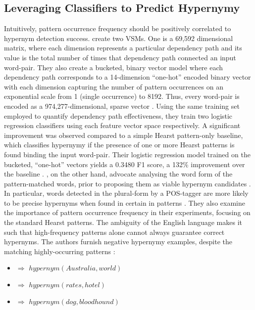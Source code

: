 \subsection{Leveraging Classifiers to Predict Hypernymy}
Intuitively, pattern occurrence frequency should be positively correlated to hypernym detection success.  \citeauthor{Snow2004} create two \ac{VSM}s.  One is a 69,592 dimensional matrix, where each dimension represents a particular dependency path and its value is the total number of times that dependency path connected an input word-pair.  They also create a bucketed, binary vector model where each dependency path corresponds to a 14-dimension “one-hot” encoded binary vector with each dimension capturing the number of pattern occurrences on an exponential scale from 1 (single occurrence) to 8192.  Thus, every word-pair is encoded as a 974,277-dimensional, sparse vector \citep{Snow2004}.  Using the same training set employed to quantify dependency path effectiveness, they train two logistic regression classifiers using each feature vector space respectively.  A significant improvement was observed compared to a simple Hearst pattern-only baseline, which classifies hypernymy if the presence of one or more Hearst patterns is found binding the input word-pair.  Their logistic regression model trained on the bucketed, “one-hot” vectors yields a 0.3480 F1 score, a 132\% improvement over the baseline \citep{Snow2004}. 
\citeauthor{ritter2009anyway}, on the other hand, advocate analysing the word form of the pattern-matched words, prior to proposing them as viable hypernym candidates \citep{ritter2009anyway}.  In particular, words detected in the plural-form by a POS-tagger are more likely to be precise hypernyms when found in certain in patterns \citep{ritter2009anyway}.  They also examine the importance of pattern occurrence frequency in their experiments, focusing on the standard Hearst patterns.  The ambiguity of the English language makes it such that high-frequency patterns alone cannot always guarantee correct hypernyms.  The authors furnish negative hypernymy examples, despite the matching highly-occurring patterns \citep{ritter2009anyway}:
\begin{itemize}
    \item {} $\Rightarrow$ $hypernym(Australia, world)$
    \item {} $\Rightarrow$ $hypernym(rates, hotel)$
    \item {} $\Rightarrow$ $hypernym(dog, bloodhound)$
\end{itemize}

